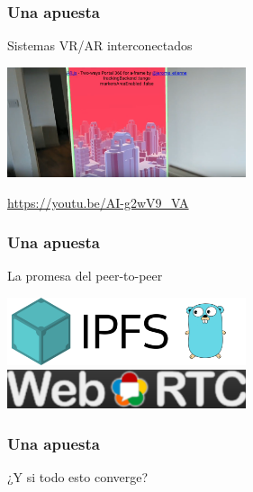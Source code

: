 \begin{frame}[fragile]
  \frametitle{Una apuesta}

  Sistemas VR/AR interconectados

  \begin{center}
  \includegraphics[width=7cm]{figs/aframe-portal}
  \end{center}

  {\small
  \url{https://youtu.be/AI-g2wV9_VA}
  }
  
\end{frame}

\begin{frame}[fragile]
  \frametitle{Una apuesta}

  La promesa del peer-to-peer

  \begin{center}
  \includegraphics[width=7cm]{figs/ipfs}
  \includegraphics[width=7cm]{figs/webrtc}
  \end{center}
  
\end{frame}

\begin{frame}[fragile]
  \frametitle{Una apuesta}

  \begin{center}
  {\Large
  ¿Y si todo esto converge?
  }
  \end{center}
  
\end{frame}
